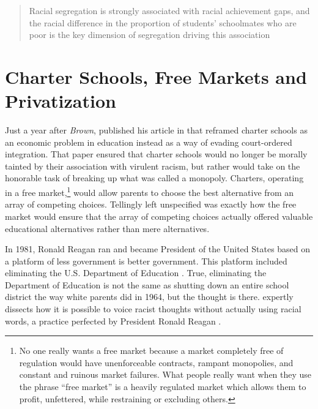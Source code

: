 \begin{quote}
Racial segregation is strongly associated with racial achievement gaps, and the racial difference in the proportion of students’ schoolmates who are poor is the key dimension of segregation driving this association  \parencite[47]{Reardon2016}
\end{quote}

\section{Charter Schools, Free Markets  and Privatization}\label{sec:freemarkets}\indent

Just a year after \textit{Brown},  \textcite{Friedman1955} published his article  in  \parencite{Friedman1955} that reframed charter schools as an economic problem in education instead as a way of evading court-ordered integration. That paper ensured that charter schools would no longer be morally tainted by their association with virulent racism, but rather would take on the honorable task of breaking up what was called a monopoly. Charters, operating in a free market,\footnote{No one really wants a free market because a  market completely free of regulation would have unenforceable contracts, rampant monopolies, and constant and ruinous market failures. What people really want when they use the phrase ``free market'' is a heavily regulated market which allows them to profit, unfettered, while restraining or excluding others.} would allow parents to choose the best alternative from an array of competing choices. Tellingly left unspecified was exactly how the free market would ensure that the array of competing choices actually offered valuable educational alternatives rather than mere alternatives.

In 1981, Ronald Reagan ran and became President of the United States based on a platform of less government is better government. This platform included eliminating the U.S. Department of Education \parencite{gop1980}. True, eliminating the Department of Education is not the same as shutting down an entire school district the way white parents did in 1964, but the thought is there. \textcite{Haney-López2014} expertly dissects how it is possible to voice racist thoughts without actually using racial words, a practice perfected by President Ronald Reagan \parencite{Haney-López2014}.


